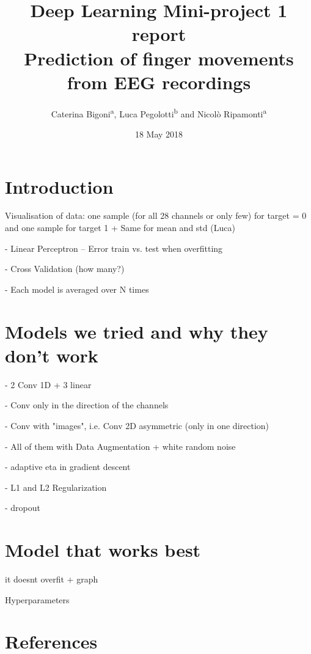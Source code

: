 \documentclass{article}
\begin{document}
\title{Deep Learning Mini-project 1 report \\ Prediction of finger movements from EEG recordings}
\author{Caterina Bigoni\textsuperscript{a}, Luca Pegolotti\textsuperscript{b} and Nicol\`o Ripamonti\textsuperscript{a}}
\date{18 May 2018}
\maketitle





\section{Introduction}
 
 
 Visualisation of data: one sample (for all 28 channels or only few) for target = 0 and one sample for target 1
 + Same for mean and std (Luca)
 
 - Linear Perceptron --  Error train vs. test when overfitting 
 
 
 - Cross Validation (how many?)
 
 - Each model is averaged over N times 
 
 \section{Models we tried and why they don't work}

 
 - 2 Conv 1D + 3 linear 
 
 - Conv only in the direction of the channels \cite{zheng2014time}
 
 - Conv with "images", i.e. Conv 2D asymmetric (only in one direction) \cite{schirrmeister2017deep}
 
 - All of them with Data Augmentation + white random noise \cite{wang2018data}
 
 -  adaptive eta in gradient descent 
 
 - L1 and L2 Regularization \cite{goodfellow2016deep} 
 
 - dropout 
 
 
 
  \section{Model that works best}
 
 it doesnt overfit + graph
 
 
 Hyperparameters 
 
 
 
\section{References}

 
  
  
  
\end{document}
